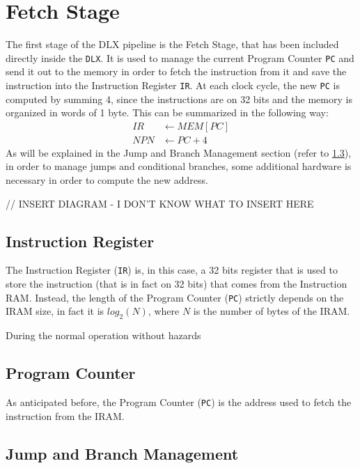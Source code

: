 \chapter{Fetch Stage}
The first stage of the DLX pipeline is the Fetch Stage, that has been included directly inside the \texttt{DLX}. It is used to manage the current Program Counter \texttt{PC} and send it out to the memory in order to fetch the instruction from it and save the instruction into the Instruction Register \texttt{IR}. At each clock cycle, the new \texttt{PC} is computed by summing 4, since the instructions are on 32 bits and the memory is organized in words of 1 byte. This can be summarized in the following way:
\begin{align*}
	IR &\leftarrow MEM[PC]\\
	NPN &\leftarrow PC + 4
\end{align*}
As will be explained in the Jump and Branch Management section (refer to \ref{sec:jmp_branch}), in order to manage jumps and conditional branches, some additional hardware is necessary in order to compute the new address.

// INSERT DIAGRAM - I DON'T KNOW WHAT TO INSERT HERE 
\section{Instruction Register}
The Instruction Register (\texttt{IR}) is, in this case, a 32 bits register that is used to store the instruction (that is in fact on 32 bits) that comes from the Instruction RAM. Instead, the length of the Program Counter (\texttt{PC}) strictly depends on the IRAM size, in fact it is $log_2(N)$, where $N$ is the number of bytes of the IRAM.

During the normal operation without hazards 

\section{Program Counter}
As anticipated before, the Program Counter (\texttt{PC}) is the address used to fetch the instruction from the IRAM.
\section{Jump and Branch Management}
\label{sec:jmp_branch}